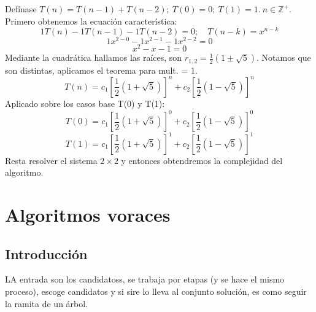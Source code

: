 \documentclass[tikz,11pt,fleqn]{book} %
\begin{document}
\begin{example}
    Defínase $T(n)=T(n-1)+T(n-2);~ T(0)=0;~ T(1)=1.~ n\in\mathbb{Z}^+$.\\
    Primero obtenemos la ecuación característica:
    $$ 1T(n)-1T(n-1)-1T(n-2)=0;\quad T(n-k)=x^{n-k} $$
    $$ 1x^{2-0}-1x^{2-1}-1x^{2-2}=0 $$
    $$ x^2-x-1=0 $$
        Mediante la cuadrática hallamos las raíces, son $r_{1,2}=\frac12(1\pm\sqrt5)$. Notamos que son distintas, aplicamos el teorema para mult. = 1.
        $$ T(n)=c_1[\frac12(1+\sqrt5)]^n+c_2[\frac12(1-\sqrt5)]^n $$
        Aplicado sobre los casos base T(0) y T(1):
        $$ T(0)=c_1[\frac12(1+\sqrt5)]^0+c_2[\frac12(1-\sqrt5)]^0 $$
        $$ T(1)=c_1[\frac12(1+\sqrt5)]^1+c_2[\frac12(1-\sqrt5)]^1 $$
        Resta resolver el sistema $2\times2$ y entonces obtendremos la complejidad del algoritmo.        
\end{example}


\chapter{Algoritmos voraces}
\section{Introducción}
LA entrada son los candidatoss, se trabaja por etapas (y se hace el mismo proceso), escoge candidatos y si sire lo lleva al conjunto solución, es como seguir la ramita de un árbol.
\end{document}
